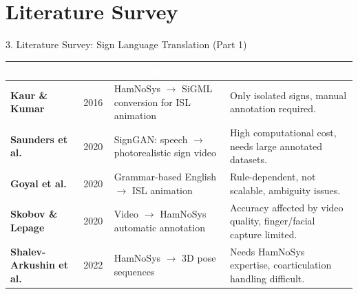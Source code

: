 \documentclass[aspectratio=169]{beamer}
\begin{document}
\section{Literature Survey}
\begin{frame}{3. Literature Survey: Sign Language Translation (Part 1)}
\begin{table}
\centering
\renewcommand{\arraystretch}{1.3}
\scriptsize
\begin{tabular}{|p{3.0cm}|c|p{4.5cm}|p{4.5cm}|}
\hline
\rowcolor{maroon}
\textcolor{white}{\textbf{Authors}} & \textcolor{white}{\textbf{Year}} & \textcolor{white}{\textbf{Key Contribution}} & \textcolor{white}{\textbf{Limitation}} \\
\hline
\rowcolor{lightblue}
\textbf{Kaur \& Kumar} & 2016 & HamNoSys $\rightarrow$ SiGML conversion for ISL animation & Only isolated signs, manual annotation required. \\
\hline
\rowcolor{lightgreen}
\textbf{Saunders et al.} & 2020 & SignGAN: speech $\rightarrow$ photorealistic sign video & High computational cost, needs large annotated datasets. \\
\hline
\rowcolor{lightcyan}
\textbf{Goyal et al.} & 2020 & Grammar-based English $\rightarrow$ ISL animation & Rule-dependent, not scalable, ambiguity issues. \\
\hline
\rowcolor{lightorange}
\textbf{Skobov \& Lepage} & 2020 & Video $\rightarrow$ HamNoSys automatic annotation & Accuracy affected by video quality, finger/facial capture limited. \\
\hline
\rowcolor{lightpurple}
\textbf{Shalev-Arkushin et al.} & 2022 & HamNoSys $\rightarrow$ 3D pose sequences & Needs HamNoSys expertise, coarticulation handling difficult. \\
\hline
\end{tabular}
\end{table}

\vspace{0.15cm}
\centering
{}
\end{frame}
\end{document}
